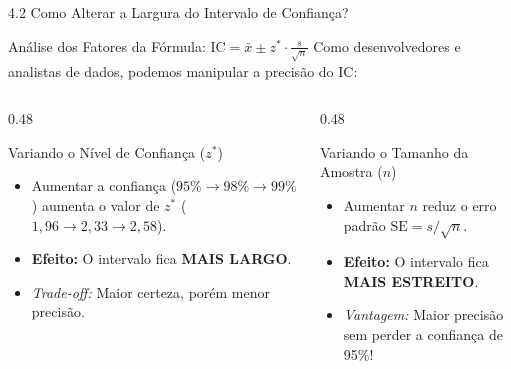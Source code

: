 \documentclass[10pt, aspectratio=169]{beamer}
\begin{document}
\begin{frame}{4.2 Como Alterar a Largura do Intervalo de Confiança?}
    \begin{block}{Análise dos Fatores da Fórmula: $\text{IC} = \bar{x} \pm z^* \cdot \frac{s}{\sqrt{n}}$}
        Como desenvolvedores e analistas de dados, podemos manipular a precisão do IC:
    \end{block}

    \vspace{0.2cm}

    \begin{columns}[T]
        \begin{column}{0.48\textwidth}
            \begin{alertblock}{Variando o Nível de Confiança ($z^*$)}
                \begin{itemize}
                    \item Aumentar a confiança ($95\% \to 98\% \to 99\%$) aumenta o valor de $z^*$ ($1{,}96 \to 2{,}33 \to 2{,}58$).
                    \item \textbf{Efeito:} O intervalo fica \textbf{MAIS LARGO}.
                    \item \textit{Trade-off:} Maior certeza, porém menor precisão.
                \end{itemize}
            \end{alertblock}
        \end{column}

        \begin{column}{0.48\textwidth}
            \begin{exampleblock}{Variando o Tamanho da Amostra ($n$)}
                \begin{itemize}
                    \item Aumentar $n$ reduz o erro padrão $\text{SE} = s/\sqrt{n}$.
                    \item \textbf{Efeito:} O intervalo fica \textbf{MAIS ESTREITO}.
                    \item \textit{Vantagem:} Maior precisão sem perder a confiança de 95\%!
                \end{itemize}
            \end{exampleblock}
        \end{column}
    \end{columns}
\end{frame}
\end{document}
